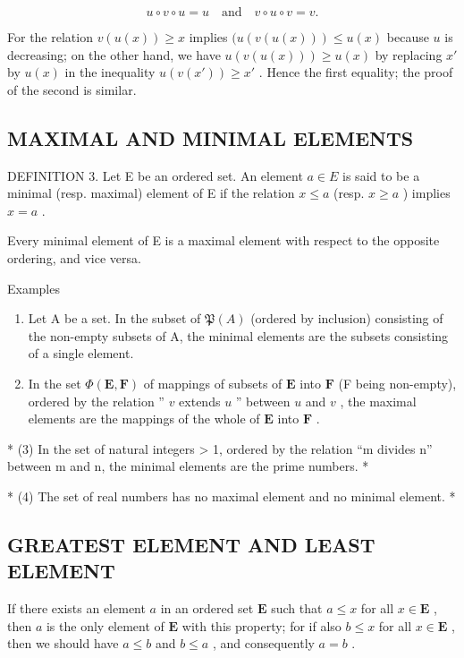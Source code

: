 \[
u \circ v \circ u = u \quad \text{and} \quad v \circ u \circ v = v.
\]

For the relation \(v(u(x)) \geqslant x\) implies \((u(v(u(x))) \leqslant u(x)\) because \(u\) is decreasing; on the other hand, we have \(u(v(u(x))) \geqslant u(x)\) by replacing \(x'\) by \(u(x)\) in the inequality \(u(v(x')) \geqslant x'\) . Hence the first equality; the proof of the second is similar.

\subsection{MAXIMAL AND MINIMAL ELEMENTS}

DEFINITION 3. Let E be an ordered set. An element \(a \in E\) is said to be a minimal (resp. maximal) element of E if the relation \(x \leqslant a\) (resp. \(x \geqslant a\) ) implies \(x = a\) .

Every minimal element of E is a maximal element with respect to the opposite ordering, and vice versa.

Examples

\begin{enumerate}
\def\labelenumi{(\arabic{enumi})}
\item
  Let A be a set. In the subset of \(\mathfrak{P}(A)\) (ordered by inclusion) consisting of the non-empty subsets of A, the minimal elements are the subsets consisting of a single element.
\item
  In the set \(\Phi(\mathbf{E},\mathbf{F})\) of mappings of subsets of \(\mathbf{E}\) into \(\mathbf{F}\) (F being non-empty), ordered by the relation '' \(v\) extends \(u\) '' between \(u\) and \(v\) , the maximal elements are the mappings of the whole of \(\mathbf{E}\) into \(\mathbf{F}\) .
\end{enumerate}

* (3) In the set of natural integers \textgreater{} 1, ordered by the relation ``m divides n'' between m and n, the minimal elements are the prime numbers. *

* (4) The set of real numbers has no maximal element and no minimal element. *

\subsection{GREATEST ELEMENT AND LEAST ELEMENT}

If there exists an element \(a\) in an ordered set \(\mathbf{E}\) such that \(a \leqslant x\) for all \(x \in \mathbf{E}\) , then \(a\) is the only element of \(\mathbf{E}\) with this property; for if also \(b \leqslant x\) for all \(x \in \mathbf{E}\) , then we should have \(a \leqslant b\) and \(b \leqslant a\) , and consequently \(a = b\) .

